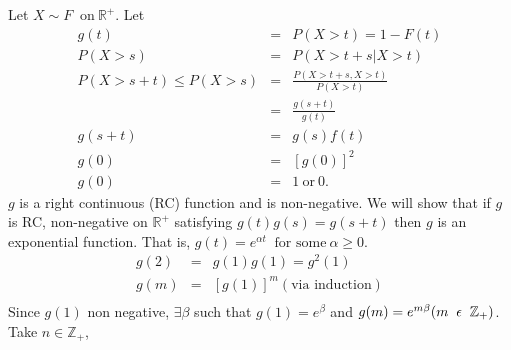 \documentclass[11 pt]{article}
\theoremstyle{plain}
\theoremstyle{definition}
\theoremstyle{remark}
\begin{document}
 
Let $X\sim F~ \text{ on}~  \mathbb{R}^{+}$. Let \\
\begin{eqnarray*}
  g(t) &=& P(X>t) = 1-F (t) \\
  P(X>s) &=& P(X>t+s| X>t) \\
  P(X>s+t) \leq P(X>s) &=& \frac{P(X>t+s, X>t)}{P(X>t)} \\
   &=& \frac{g(s+t)}{g(t)} \\
  g(s+t) &=& g(s)f(t)\\
  g(0)&=& [g(0)]^{2}\\
  g(0)&=&1~ \text{or}~ 0. 
\end{eqnarray*}
$g$ is a right continuous (RC) function and is non-negative. We will show that if $g$ is RC, non-negative on $\mathbb{R}^{+}$ satisfying $ g(t) g(s)= g(s+t)$ then $g$ is an exponential function. That is, $g(t) = e^{\alpha t} ~\text{ for some}~  \alpha \geq 0$.
 \begin{eqnarray*}
            g(2) &=& g(1) g(1) =g^{2}(1) \\
            g(m) &=& [g(1)]^{m} (\text{via induction}) \\
               \end{eqnarray*}
               Since $g(1)$ non negative, $\exists  \beta$ such that $g(1)=e^{\beta}$ and $g(m)= e^{m \beta} (  m \hspace{0.2cm}\epsilon \hspace{0.2cm}\mathbb{Z}_{+})$. Take $n \in \mathbb{Z}_{+} $,\\
             
\end{document}
